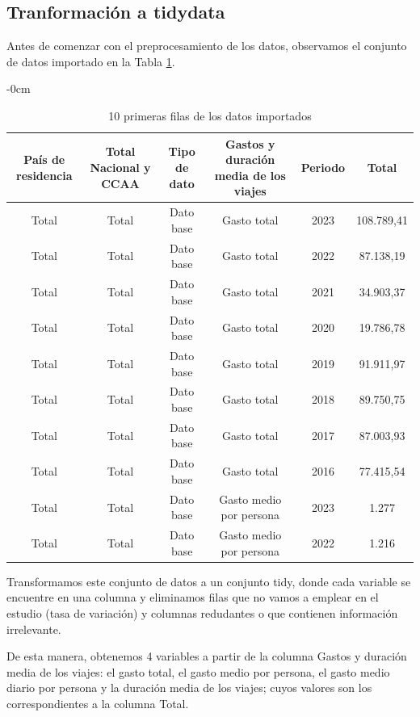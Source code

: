 \documentclass[data,article,submit,moreauthors,pdftex]{Definitions/mdpi}
\begin{document}
\subsection{Tranformación a tidydata}\label{tranformaciuxf3n-a-tidydata}

Antes de comenzar con el preprocesamiento de los datos, observamos el
conjunto de datos importado en la Tabla \ref{tab:unnamed-chunk-4}.

\begin{table}[H]

\caption{\label{tab:unnamed-chunk-4}10 primeras filas de los datos importados}
\begin{adjustwidth}{-\extralength}{0cm}
             \small
\begin{tabular}[t]{cccccc}
\toprule
País de residencia & Total Nacional y CCAA & Tipo de dato & Gastos y duración media de los viajes & Periodo & Total\\
\midrule
Total & Total & Dato base & Gasto total & 2023 & 108.789,41\\
Total & Total & Dato base & Gasto total & 2022 & 87.138,19\\
Total & Total & Dato base & Gasto total & 2021 & 34.903,37\\
Total & Total & Dato base & Gasto total & 2020 & 19.786,78\\
Total & Total & Dato base & Gasto total & 2019 & 91.911,97\\
Total & Total & Dato base & Gasto total & 2018 & 89.750,75\\
Total & Total & Dato base & Gasto total & 2017 & 87.003,93\\
Total & Total & Dato base & Gasto total & 2016 & 77.415,54\\
Total & Total & Dato base & Gasto medio por persona & 2023 & 1.277\\
Total & Total & Dato base & Gasto medio por persona & 2022 & 1.216\\
\bottomrule
\end{tabular}
    \end{adjustwidth}
\end{table}

Transformamos este conjunto de datos a un conjunto tidy, donde cada
variable se encuentre en una columna y eliminamos filas que no vamos a
emplear en el estudio (tasa de variación) y columnas redudantes o que
contienen información irrelevante.

De esta manera, obtenemos 4 variables a partir de la columna Gastos y
duración media de los viajes: el gasto total, el gasto medio por
persona, el gasto medio diario por persona y la duración media de los
viajes; cuyos valores son los correspondientes a la columna Total.
\end{document}
